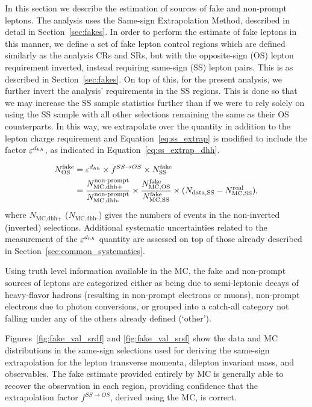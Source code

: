 In this section we describe the estimation of sources of fake and non-prompt leptons.
The analysis uses the Same-sign Extrapolation Method, described in detail in Section~\ref{sec:fakes}.
In order to perform the estimate of fake leptons in this manner, we define a set of fake lepton control
regions which are defined similarly as the analysis CRs and SRs, but with the opposite-sign (OS)
lepton requirement inverted, instead requiring same-sign (SS) lepton pairs.
This is as described in Section~\ref{sec:fakes}.
On top of this, for the present analysis, we further invert the analysis' \dhh requirements in the SS
regions.
This is done so that we may increase the SS sample statistics further than if we were to rely solely
on using the SS sample with all other selections remaining the same as their OS counterparts.
In this way, we extrapolate over the \dhh quantity in addition to the lepton charge requirement
and Equation~\ref{eq:ss_extrap} is modified to include the factor $\varepsilon^{ d_{hh}}$, as indicated in Equation~\ref{eq:ss_extrap_dhh}.

\begin{align}
    N_{\text{OS}}^{\text{fake}} &= \varepsilon^{ d_{hh}} \times f^{SS \rightarrow OS} \times N_{\text{SS}}^{\text{fake}} \nonumber \\
        &= \frac{N_{\text{MC,dhh+}}^{\text{non-prompt}}}{N_{\text{MC,dhh-}}^{\text{non-prompt}}} \times  \frac{ N_{\text{MC,OS}}^{\text{fake}} }{ N_{\text{MC,SS}}^{\text{fake}} } \times ( N_{\text{data,SS}} - N_{\text{MC,SS}}^{\text{real}} ),
        \label{eq:ss_extrap_dhh}
\end{align}
where $N_{\text{MC,dhh+}}$ ($N_{\text{MC,dhh-}}$) gives the numbers of events in the non-inverted (inverted)
\dhh selections.
Additional systematic uncertainties related to the measurement of the $\varepsilon^{ d_{hh}}$ quantity are
assessed on top of those already described in Section~\ref{sec:common_systematics}.

Using truth level information available in the MC, the fake and non-prompt sources of leptons are
categorized either as being due to semi-leptonic decays of heavy-flavor hadrons (resulting in non-prompt electrons
or muons), non-prompt electrons due to photon conversions, or grouped into a catch-all category not
falling under any of the others already defined (`other').

Figures~\ref{fig:fake_val_srdf} and \ref{fig:fake_val_srsf} show the data and MC distributions in the same-sign
selections used for deriving the same-sign extrapolation for the lepton transverse momenta, dilepton invariant
mass, and \dhh observables.
The fake estimate provided entirely by MC is generally able to recover the observation in each region, providing
confidence that the extrapolation factor $f^{SS \rightarrow OS}$, derived using the MC, is correct.

